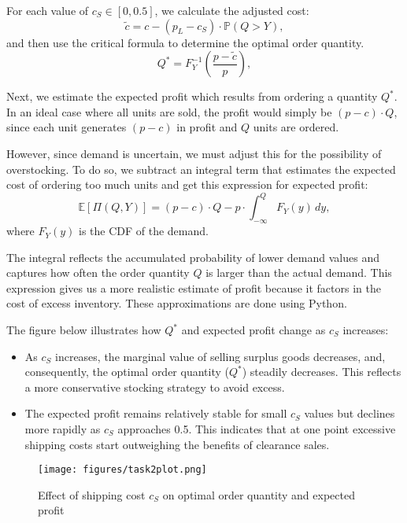 \documentclass{article}
\begin{document}
\noindent
For each value of $c_S \in [0, 0.5]$, we calculate the adjusted cost:
\[
\tilde{c} = c - (p_L - c_S) \cdot \mathbb{P}(Q > Y),
\]
and then use the critical formula to determine the optimal order quantity.
\[
Q^* = F_Y^{-1} \left( \frac{p - \tilde{c}}{p} \right),
\]

Next, we estimate the expected profit which results from ordering a quantity $Q^*$. In an ideal case where all units are sold, the profit would simply be $(p - c) \cdot Q$,
since each unit generates $(p - c)$ in profit and $Q$ units are ordered.

However, since demand is uncertain, we must adjust this for the possibility of overstocking. To do so, we subtract an integral term that estimates the expected cost of ordering too much units and get this expression for expected profit:
\[
\mathbb{E}[\Pi(Q, Y)] = (p - c) \cdot Q - p \cdot \int_{-\infty}^{Q} F_Y(y) \, dy,
\]
where $F_Y(y)$ is the CDF of the demand.

The integral reflects the accumulated probability of lower demand values and captures how often the order quantity $Q$ is larger than the actual demand. This expression gives us a more realistic estimate of profit because it factors in the cost of excess inventory. These approximations are done using Python.

\bigskip \bigskip

The figure below illustrates how $Q^*$ and expected profit change as $c_S$ increases:

\begin{itemize}
    \item As $c_S$ increases, the marginal value of selling surplus goods decreases, and, consequently, the optimal order quantity ($Q^*$) steadily decreases. This reflects a more conservative stocking strategy to avoid excess.
    
    \item The expected profit remains relatively stable for small $c_S$ values but declines more rapidly as $c_S$ approaches 0.5. This indicates that at one point excessive shipping costs start outweighing the benefits of clearance sales.
\end{itemize}

\begin{figure}[H]
    \centering
    \texttt{[image: figures/task2plot.png]}
    \caption{Effect of shipping cost $c_S$ on optimal order quantity and expected profit}
\end{figure}
\end{document}
